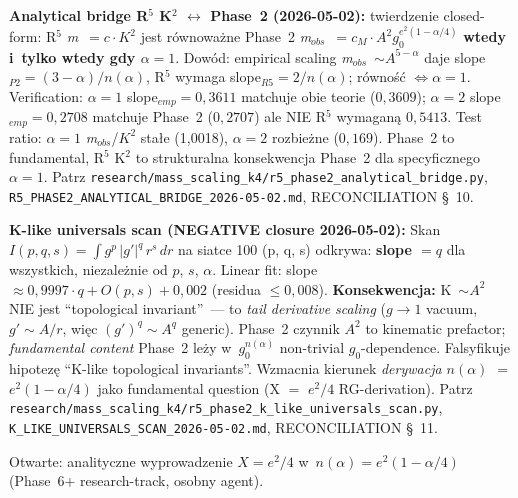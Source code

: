 \begin{remark}
\textbf{Analytical bridge R$^5$ K$^2$ $\leftrightarrow$ Phase~2 (2026-05-02):}
twierdzenie closed-form: R$^5$ \emph{m}~$=c\cdot K^2$ jest r\'ownowa\.zne Phase~2
\emph{m$_{obs}$}~$=c_M\cdot A^2 g_0^{e^2(1-\alpha/4)}$ \textbf{wtedy i~tylko wtedy
gdy $\alpha=1$}. Dow\'od: empirical scaling \emph{m$_{obs}$}~$\sim A^{5-\alpha}$ daje
slope$_{P2}=(3-\alpha)/n(\alpha)$, R$^5$ wymaga slope$_{R5}=2/n(\alpha)$;
r\'owno\'s\'c $\Leftrightarrow \alpha=1$. Verification: $\alpha=1$
slope$_{emp}=0{,}3611$ matchuje obie teorie ($0{,}3609$); $\alpha=2$
slope$_{emp}=0{,}2708$ matchuje Phase~2 ($0{,}2707$) ale NIE R$^5$ wymaganą
$0{,}5413$. Test ratio: $\alpha=1$ \emph{m$_{obs}$}/$K^2$ stałe (1{,}0018),
$\alpha=2$ rozbie\.zne ($0{,}169$). Phase~2 to fundamental, R$^5$ K$^2$ to
strukturalna konsekwencja Phase~2 dla specyficznego $\alpha=1$. Patrz
\texttt{research/mass\_scaling\_k4/r5\_phase2\_analytical\_bridge.py},
\texttt{R5\_PHASE2\_ANALYTICAL\_BRIDGE\_2026-05-02.md},
RECONCILIATION \S~10.

\textbf{K-like universals scan (NEGATIVE closure 2026-05-02):} Skan
$I(p, q, s) = \int g^p\, |g'|^q\, r^s\, dr$ na siatce 100 (p, q, s) odkrywa:
\textbf{slope $= q$} dla wszystkich, niezale\.znie od $p$, $s$, $\alpha$.
Linear fit: slope $\approx 0{,}9997\cdot q + O(p, s) + 0{,}002$ (residua $\le 0{,}008$).
\textbf{Konsekwencja:} K~$\sim A^2$ NIE jest ``topological invariant''~--- to
\emph{tail derivative scaling} ($g\to 1$ vacuum, $g'\sim A/r$, wi\k{e}c $(g')^q\sim A^q$
generic). Phase~2 czynnik $A^2$ to kinematic prefactor; \emph{fundamental content}
Phase~2 le\.zy w~$g_0^{n(\alpha)}$ non-trivial $g_0$-dependence. Falsyfikuje hipotez\k{e}
``K-like topological invariants''. Wzmacnia kierunek \emph{derywacja $n(\alpha)$
$=$ $e^2(1-\alpha/4)$} jako fundamental question (X $=$ $e^2/4$ RG-derivation).
Patrz \texttt{research/mass\_scaling\_k4/r5\_phase2\_k\_like\_universals\_scan.py},
\texttt{K\_LIKE\_UNIVERSALS\_SCAN\_2026-05-02.md}, RECONCILIATION \S~11.

Otwarte: analityczne wyprowadzenie $X = e^2/4$ w~$n(\alpha) = e^2(1-\alpha/4)$
(Phase~6+ research-track, osobny agent).


\end{remark}
